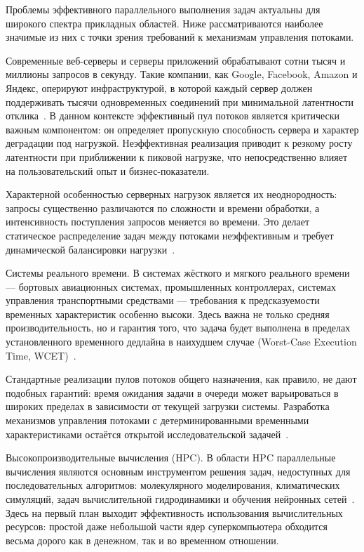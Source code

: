 Проблемы эффективного параллельного выполнения задач актуальны для широкого спектра прикладных областей. Ниже рассматриваются наиболее значимые из них с точки зрения требований к механизмам управления потоками.

Современные веб-серверы и серверы приложений обрабатывают сотни тысяч и миллионы запросов в секунду. Такие компании, как Google, Facebook, Amazon и Яндекс, оперируют инфраструктурой, в которой каждый сервер должен поддерживать тысячи одновременных соединений при минимальной латентности отклика~\cite{Wiggins2012}. В данном контексте эффективный пул потоков является критически важным компонентом: он определяет пропускную способность сервера и характер деградации под нагрузкой. Неэффективная реализация приводит к резкому росту латентности при приближении к пиковой нагрузке, что непосредственно влияет на пользовательский опыт и бизнес-показатели.

Характерной особенностью серверных нагрузок является их неоднородность: запросы существенно различаются по сложности и времени обработки, а интенсивность поступления запросов меняется во времени. Это делает статическое распределение задач между потоками неэффективным и требует динамической балансировки нагрузки~\cite{Welsh2001}.

Системы реального времени. В системах жёсткого и мягкого реального времени --- бортовых авиационных системах, промышленных контроллерах, системах управления транспортными средствами --- требования к предсказуемости временных характеристик особенно высоки. Здесь важна не только средняя производительность, но и гарантия того, что задача будет выполнена в пределах установленного временного дедлайна в наихудшем случае (Worst-Case Execution Time, WCET)~\cite{Wilhelm2008}.

Стандартные реализации пулов потоков общего назначения, как правило,
не дают подобных гарантий: время ожидания задачи в очереди может
варьироваться в широких пределах в зависимости от текущей загрузки
системы. Разработка механизмов управления потоками с детерминированными
временными характеристиками остаётся открытой исследовательской
задачей~\cite{Faggioli2009}.

Высокопроизводительные вычисления (HPC). В области HPC параллельные вычисления являются основным инструментом решения задач, недоступных для последовательных алгоритмов: молекулярного моделирования, климатических симуляций, задач вычислительной гидродинамики и обучения нейронных сетей~\cite{Dongarra2014}. Здесь на первый план выходит эффективность использования вычислительных ресурсов: простой даже небольшой части ядер суперкомпьютера обходится весьма дорого как в денежном, так и во временном отношении.

